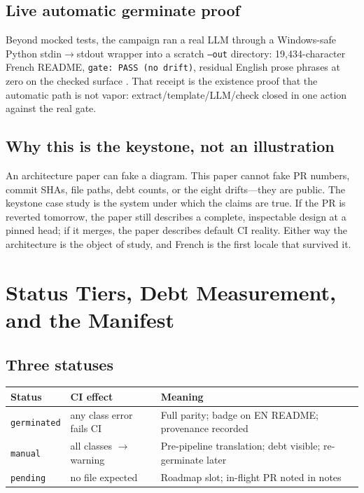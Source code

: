 \documentclass[11pt]{article}
\theoremstyle{definition}
\theoremstyle{plain}
\theoremstyle{remark}
\begin{document}
\subsection{Live automatic germinate proof}

Beyond mocked tests, the campaign ran a real LLM through a Windows-safe
Python stdin$\to$stdout wrapper into a scratch \texttt{--out} directory:
19{,}434-character French README, \texttt{gate: PASS (no drift)}, residual
English prose phrases at zero on the checked surface
\citep{docsgermskill}. That receipt is the existence proof that the automatic
path is not vapor: extract/template/LLM/check closed in one action against
the real gate.

\subsection{Why this is the keystone, not an illustration}

An architecture paper can fake a diagram. This paper cannot fake PR numbers,
commit SHAs, file paths, debt counts, or the eight drifts---they are public.
The keystone case study is the system under which the claims are true. If the
PR is reverted tomorrow, the paper still describes a complete, inspectable
design at a pinned head; if it merges, the paper describes default CI
reality. Either way the architecture is the object of study, and French is
the first locale that survived it.



\section{Status Tiers, Debt Measurement, and the Manifest}
\label{sec:debt}

\subsection{Three statuses}

\begin{center}
\begin{tabular}{@{}llp{}@{}}
\toprule
Status & CI effect & Meaning \\
\midrule
\texttt{germinated} & any class error fails CI & Full parity; badge on EN README; provenance recorded \\
\texttt{manual} & all classes $\to$ warning & Pre-pipeline translation; debt visible; re-germinate later \\
\texttt{pending} & no file expected & Roadmap slot; in-flight PR noted in notes \\
\bottomrule
\end{tabular}
\end{center}
\end{document}
